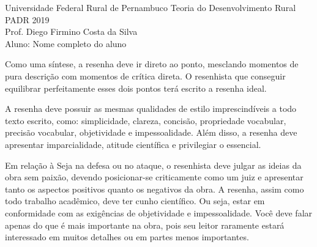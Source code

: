 \documentclass[12pt, a4paper]{article}
\newcommand{\+}[1]{\ensuremath{\mathbf{#1}}} %
\begin{document}
\noindent Universidade Federal Rural de Pernambuco \hfill Teoria do Desenvolvimento Rural\\
\noindent PADR \hfill 2019\\
\noindent Prof. Diego Firmino Costa da Silva \\
\noindent Aluno: Nome completo do aluno \\ %
\justify


Como uma síntese, a resenha deve ir direto ao ponto, mesclando momentos de pura descrição com momentos de crítica direta. O resenhista que conseguir equilibrar perfeitamente esses dois pontos terá escrito a resenha ideal.

A resenha deve possuir as mesmas qualidades de estilo imprescindíveis a todo texto escrito, como: simplicidade, clareza, concisão, propriedade vocabular, precisão vocabular, objetividade e impessoalidade. Além disso, a resenha deve apresentar imparcialidade, atitude científica e privilegiar o essencial.

Em relação à Seja na defesa ou no ataque, o resenhista deve julgar as ideias da obra sem paixão, devendo posicionar-se criticamente como um juiz e apresentar tanto os aspectos positivos quanto os negativos da obra. A resenha, assim como todo trabalho acadêmico, deve ter cunho científico. Ou seja, estar em conformidade com as exigências de objetividade e impessoalidade. Você deve falar apenas do que é mais importante na obra, pois seu leitor raramente estará interessado em muitos detalhes ou em partes menos importantes.
\end{document}
